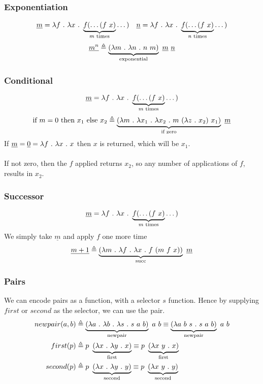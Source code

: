 \documentclass{report}
\begin{document}
\subsubsection*{Exponentiation}
\[\begin{matrix}
		\underline{m} =  \lambda f \ . \ \lambda x \ . \ \underbrace{f(\dots (f \ x)}_\text{$m$ times} \dots ) & \underline{n} =  \lambda f \ . \ \lambda x \ . \ \underbrace{f(\dots (f \ x)}_\text{$n$ times} \dots ) \\
	\end{matrix}\]
\[\underline{m^n} \triangleq \underbrace{(\lambda m \ . \ \lambda n \ . \ n \ m)}_\text{exponential} \ \underline{m} \ \underline{n}\]
\subsubsection*{Conditional}
\[\underline{m} =  \lambda f \ . \ \lambda x \ . \ \underbrace{f(\dots (f \ x)}_\text{$m$ times} \dots )\]
\[\text{if $m = 0$ then $x_1$ else $x_2$} \triangleq \underbrace{(\lambda m \ . \ \lambda x_1 \ . \ \lambda x_2 \ . \ m \ (\lambda z \ . \ x_2) \ x_1)}_\text{if zero} \ \underline{m}\]
If $\underline{m} = \underline{0} = \lambda f \ . \ \lambda x \ . \ x$ then $x$ is returned, which will be $x_1$.
\\
\\ If not zero, then the $f$ applied returns $x_2$, so any number of applications of $f$, results in $x_2$.
\subsubsection*{Successor}
\[\underline{m} =  \lambda f \ . \ \lambda x \ . \ \underbrace{f(\dots (f \ x)}_\text{$m$ times} \dots )\]
We simply take $\underline{m}$ and apply $f$ one more time
\[\underline{m + 1} \triangleq \underbrace{(\lambda m \ . \ \lambda f \ . \ \lambda x \ . \ f \ (m \ f \ x))}_\text{succ} \ \underline{m}\]

\subsubsection*{Pairs}
We can encode pairs as a function, with a selector $s$ function. Hence by supplying $first$ or $second$ as the selector, we can use the pair.
\[\begin{split}
		newpair(a,b) &\triangleq \lambapp{\lambapp{\underbrace{(\lambfun{a}{\lambfun{b}{\lambfun{s}{\lambapp{\lambapp{s}{a}}{b}}}})}_\text{newpair}}{a}}{b} \equiv \lambapp{\lambapp{\underbrace{(\lambfun{\lambarg{a}{b}{s}}{\lambapp{\lambapp{s}{a}}{b}})}_\text{newpair}}{a}}{b}\\
		first(p) &\triangleq \lambapp{p}{\underbrace{(\lambfun{x}{\lambfun{y}{x}})}_\text{first}} \equiv \lambapp{p}{\underbrace{(\lambfun{\lambarg{x}{y}}{x})}_\text{first}} \\
		second(p) &\triangleq \lambapp{p}{\underbrace{(\lambfun{x}{\lambfun{y}{y}})}_\text{second}} \equiv \lambapp{p}{\underbrace{(\lambfun{\lambarg{x}{y}}{y})}_\text{second}}\\
	\end{split}\]
\end{document}
